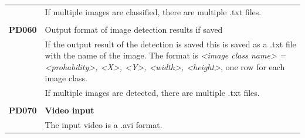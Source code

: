 \documentclass[parskip=full]{scrartcl}
\begin{document}
\begin{tabular}{p{2cm}p{11.4cm}}
& If multiple images are classified, there are multiple .txt files.\\
& \\
\textbf{PD060} & Output format of image detection results if saved\\
& If the output result of the detection is saved this is saved as a .txt file with the name of the image. The format is \textit{<image class name> = <prohability>, <X>, <Y>, <width>, <height>}, one row for each image class.\\
& If multiple images are detected, there are multiple .txt files.\\
& \\
\textbf{PD070} & \textbf{Video input}\\
& The input video is a .avi format.
\end{tabular}
\end{document}
